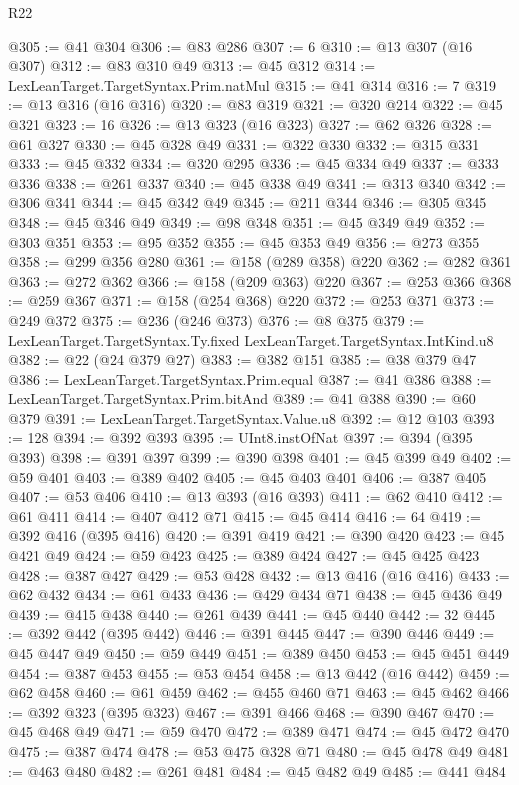 \begin{lexlean}{R22}
\begin{coremodule}
@305 := @41 @304
@306 := @83 @286
@307 := 6
@310 := @13 @307 (@16 @307)
@312 := @83 @310 @49
@313 := @45 @312
@314 := LexLeanTarget.TargetSyntax.Prim.natMul
@315 := @41 @314
@316 := 7
@319 := @13 @316 (@16 @316)
@320 := @83 @319
@321 := @320 @214
@322 := @45 @321
@323 := 16
@326 := @13 @323 (@16 @323)
@327 := @62 @326
@328 := @61 @327
@330 := @45 @328 @49
@331 := @322 @330
@332 := @315 @331
@333 := @45 @332
@334 := @320 @295
@336 := @45 @334 @49
@337 := @333 @336
@338 := @261 @337
@340 := @45 @338 @49
@341 := @313 @340
@342 := @306 @341
@344 := @45 @342 @49
@345 := @211 @344
@346 := @305 @345
@348 := @45 @346 @49
@349 := @98 @348
@351 := @45 @349 @49
@352 := @303 @351
@353 := @95 @352
@355 := @45 @353 @49
@356 := @273 @355
@358 := @299 @356 @280
@361 := @158 (@289 @358) @220
@362 := @282 @361
@363 := @272 @362
@366 := @158 (@209 @363) @220
@367 := @253 @366
@368 := @259 @367
@371 := @158 (@254 @368) @220
@372 := @253 @371
@373 := @249 @372
@375 := @236 (@246 @373)
@376 := @8 @375
@379 := LexLeanTarget.TargetSyntax.Ty.fixed LexLeanTarget.TargetSyntax.IntKind.u8
@382 := @22 (@24 @379 @27)
@383 := @382 @151
@385 := @38 @379 @47
@386 := LexLeanTarget.TargetSyntax.Prim.equal
@387 := @41 @386
@388 := LexLeanTarget.TargetSyntax.Prim.bitAnd
@389 := @41 @388
@390 := @60 @379
@391 := LexLeanTarget.TargetSyntax.Value.u8
@392 := @12 @103
@393 := 128
@394 := @392 @393
@395 := UInt8.instOfNat
@397 := @394 (@395 @393)
@398 := @391 @397
@399 := @390 @398
@401 := @45 @399 @49
@402 := @59 @401
@403 := @389 @402
@405 := @45 @403 @401
@406 := @387 @405
@407 := @53 @406
@410 := @13 @393 (@16 @393)
@411 := @62 @410
@412 := @61 @411
@414 := @407 @412 @71
@415 := @45 @414
@416 := 64
@419 := @392 @416 (@395 @416)
@420 := @391 @419
@421 := @390 @420
@423 := @45 @421 @49
@424 := @59 @423
@425 := @389 @424
@427 := @45 @425 @423
@428 := @387 @427
@429 := @53 @428
@432 := @13 @416 (@16 @416)
@433 := @62 @432
@434 := @61 @433
@436 := @429 @434 @71
@438 := @45 @436 @49
@439 := @415 @438
@440 := @261 @439
@441 := @45 @440
@442 := 32
@445 := @392 @442 (@395 @442)
@446 := @391 @445
@447 := @390 @446
@449 := @45 @447 @49
@450 := @59 @449
@451 := @389 @450
@453 := @45 @451 @449
@454 := @387 @453
@455 := @53 @454
@458 := @13 @442 (@16 @442)
@459 := @62 @458
@460 := @61 @459
@462 := @455 @460 @71
@463 := @45 @462
@466 := @392 @323 (@395 @323)
@467 := @391 @466
@468 := @390 @467
@470 := @45 @468 @49
@471 := @59 @470
@472 := @389 @471
@474 := @45 @472 @470
@475 := @387 @474
@478 := @53 @475 @328 @71
@480 := @45 @478 @49
@481 := @463 @480
@482 := @261 @481
@484 := @45 @482 @49
@485 := @441 @484

\end{coremodule}
\end{lexlean}

